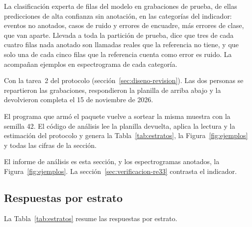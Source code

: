  La clasificación experta de \uItems{} filas del modelo en
\uItemsRecordings{} grabaciones de prueba, \uTopSample{} de ellas predicciones de
alta confianza sin anotación, en las categorías del indicador: \uCatUnannotated{}
eventos no anotados, \uCatNoise{} casos de ruido y \uCatFraming{} errores de
encuadre, más \uCatClass{} errores de clase, que van aparte. Llevada a toda la
partición de prueba, dice que tres de cada cuatro filas nada anotado son llamadas
reales que la referencia no tiene, y que solo una de cada cinco filas que la
referencia cuenta como error es ruido. La acompañan ejemplos en espectrograma de
cada categoría.

 Con la tarea~2 del protocolo
(sección~\ref{sec:diseno-revision}). Las dos personas se repartieron las
grabaciones, respondieron la planilla de arriba abajo y la devolvieron completa el
15 de noviembre de 2026.

 El programa que armó el paquete vuelve a sortear la
misma muestra con la semilla 42. El código de análisis lee la planilla devuelta,
aplica la lectura y la estimación del protocolo y genera la Tabla~\ref{tab:estratos}, la
Figura~\ref{fig:ejemplos} y todas las cifras de la sección.

 El informe de análisis es esta sección, y los
espectrogramas anotados, la Figura~\ref{fig:ejemplos}. La
sección~\ref{sec:verificacion-re33} contrasta el indicador.

\subsection{Respuestas por estrato}

La Tabla~\ref{tab:estratos} resume las respuestas por estrato.

